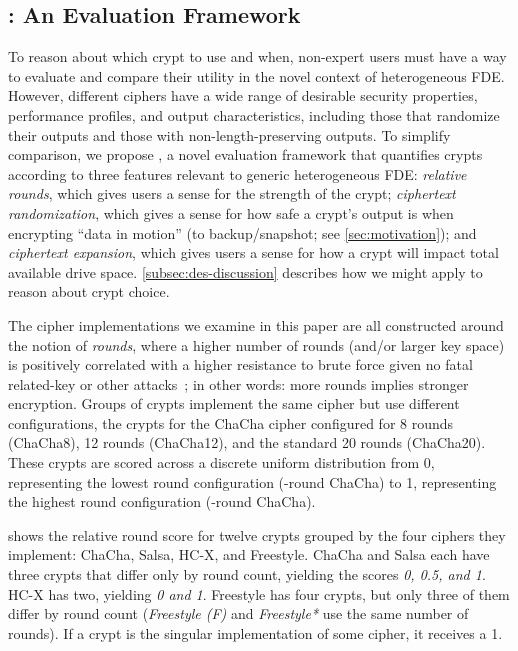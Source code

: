 \subsection{\sysC: An Evaluation Framework}\label{subsec:des-trade}

To reason about which crypt to use and when, non-expert users must have a way to
evaluate and compare their utility in the novel context of heterogeneous FDE.
However, different ciphers have a wide range of desirable security properties,
performance profiles, and output characteristics, including those that randomize
their outputs and those with non-length-preserving outputs. To simplify
comparison, we propose \sysC, a novel evaluation framework that quantifies
crypts according to three features relevant to generic heterogeneous FDE: {\em
relative rounds}, which gives users a sense for the strength of the crypt; {\em
ciphertext randomization}, which gives a sense for how safe a crypt's output is
when encrypting ``data in motion'' (\eg to backup/snapshot; see
\cref{sec:motivation}); and {\em ciphertext expansion}, which gives users a
sense for how a crypt will impact total available drive space.
\cref{subsec:des-discussion} describes how we might apply \sysC to reason about
crypt choice.




 The cipher implementations we examine in this
paper are all constructed around the notion of {\em rounds}, where a higher
number of rounds (and/or larger key space) is positively correlated with a
higher resistance to brute force given no fatal related-key or other
attacks~\cite{ChaCha-Cryptanalysis}; in other words: more rounds implies
stronger encryption. Groups of crypts implement the same cipher but use
different configurations, \eg the crypts for the ChaCha cipher configured for 8
rounds (ChaCha8), 12 rounds (ChaCha12), and the standard 20 rounds (ChaCha20).
These crypts are scored across a discrete uniform distribution from 0,
representing the lowest round configuration (-round ChaCha) to 1,
representing the highest round configuration (-round ChaCha).

 shows the relative round score for twelve crypts grouped
by the four ciphers they implement: ChaCha, Salsa, HC-X, and Freestyle. ChaCha
and Salsa each have three crypts that differ only by round count, yielding the
scores {\em 0, 0.5, and 1}. HC-X has two, yielding {\em 0 and 1}. Freestyle has
four crypts, but only three of them differ by round count ({\em Freestyle (F)}
and {\em Freestyle*} use the same number of rounds). If a crypt is the singular
implementation of some cipher, it receives a 1.

